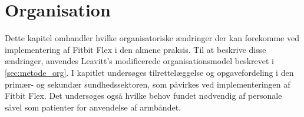\chapter{Organisation}
Dette kapitel omhandler hvilke organisatoriske ændringer der kan forekomme ved implementering af Fitbit Flex i den almene praksis. Til at beskrive disse ændringer, anvendes Leavitt's modificerede organisationsmodel beskrevet i \autoref{sec:metode_org}. I kapitlet undersøges tilrettelæggelse og opgavefordeling i den primær- og sekundær sundhedssektoren, som påvirkes ved implementeringen af Fitbit Flex. Det undersøges også hvilke behov fundet nødvendig af personale såvel som patienter for anvendelse af armbåndet.    

